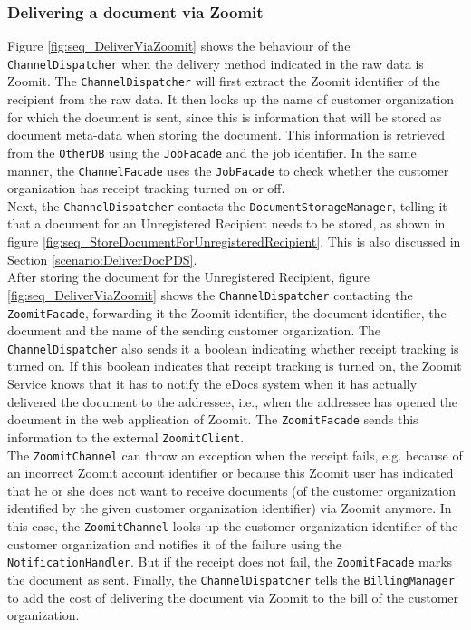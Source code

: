 \documentclass[a4paper,10pt]{article}
\begin{document}
\subsubsection{Delivering a document via Zoomit}
\label{scenario:DeliverViaZoomit}
Figure \ref{fig:seq_DeliverViaZoomit} shows the behaviour of the \texttt{ChannelDispatcher} when the delivery method indicated in the raw data is Zoomit. The \texttt{ChannelDispatcher} will first extract the Zoomit identifier of the recipient from the raw data.  It then looks up the name of customer organization for which the document is sent, since this is information that will be stored as document meta-data when storing the document. This information is retrieved from the \texttt{OtherDB} using the \texttt{JobFacade} and the job identifier. In the same manner, the \texttt{ChannelFacade} uses the \texttt{JobFacade} to check whether the customer organization has receipt tracking turned on or off.\\
Next, the \texttt{ChannelDispatcher} contacts the \texttt{DocumentStorageManager}, telling it that a document for an Unregistered Recipient needs to be stored, as shown in figure \ref{fig:seq_StoreDocumentForUnregisteredRecipient}. This is also discussed in Section \ref{scenario:DeliverDocPDS}.\\
After storing the document for the 
Unregistered Recipient, figure \ref{fig:seq_DeliverViaZoomit} shows
the \texttt{ChannelDispatcher} contacting the \texttt{ZoomitFacade}, forwarding it the Zoomit identifier, the document identifier, the document and the name of the sending customer organization. The \texttt{ChannelDispatcher} also sends it a boolean indicating whether receipt tracking is turned on. If this boolean indicates that receipt tracking is turned on, the Zoomit Service knows that it has to notify the eDocs system when it has actually delivered the document to the addressee, i.e., when the addressee has opened the document in the web application of Zoomit. The \texttt{ZoomitFacade} sends this information to the external \texttt{ZoomitClient}.\\
The \texttt{ZoomitChannel} can throw an exception when the receipt fails, e.g. because of an incorrect Zoomit account identifier or because this Zoomit user has indicated that he or she does not want to receive documents (of the customer organization identified by the given customer organization identifier) via Zoomit anymore. In this case, the \texttt{ZoomitChannel} looks up the customer organization identifier of the customer organization and notifies it of the failure using the \texttt{NotificationHandler}. But if the receipt does not fail, the \texttt{ZoomitFacade} marks the document as sent.  Finally, the \texttt{ChannelDispatcher} tells the \texttt{BillingManager} to add the cost of delivering the document via Zoomit to the bill of the customer organization.
\end{document}
